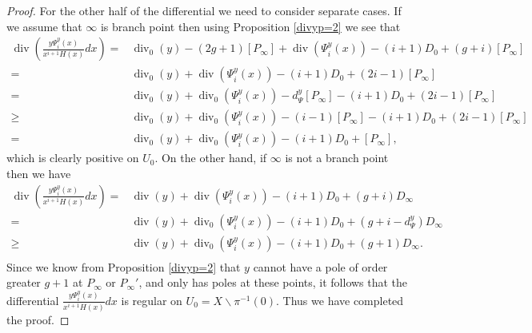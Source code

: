 \documentclass[draft, 11pt]{article} %
\theoremstyle{plain}
\theoremstyle{remark}
\DeclareMathOperator{\di}{div}
\begin{document}
\begin{proof}
For the other half of the differential we need to consider separate cases.
If we assume that $\infty$ is branch point then  using Proposition \ref{divyp=2} we see that
\begin{align*}
\di\left(\frac{y\Psi_i^y(x) }{x^{i+1}H(x)}dx \right)  =  & \di_0(y) - (2g+1)[P_\infty] + \di(\Psi_i^y(x)) - (i+1)D_0 + (g+i)[P_\infty] \\
 =  & \di_0(y) + \di(\Psi_i^y(x)) -(i+1)D_0 + (2i -1)[P_\infty] \\
 = &  \di_0(y) + \di_0(\Psi_i^y(x)) - d_\Psi^y[P_\infty] - (i+1)D_0 + (2i-1)[P_\infty] \\
 \geq &  \di_0(y) + \di_0(\Psi_i^y(x)) -(i-1)[P_\infty] -(i+1)D_0 + (2i-1)[P_\infty] \\
 =   &\di_0(y) + \di_0(\Psi_i^y(x)) -(i+1)D_0 + [P_\infty],
\end{align*}
which is clearly positive on $U_0$.
On the other hand, if $\infty$ is not a branch point then we have
\begin{align*}
\di\left(\frac{y\Psi_i^y(x) }{x^{i+1}H(x)}dx \right)  =  & \di(y) + \di(\Psi_i^y(x)) - (i+1)D_0 + (g+i)D_\infty \\
= & \di(y) + \di_0(\Psi_i^y(x)) - (i+1)D_0 + (g+i - d_\Psi^y)D_\infty \\
\geq & \di(y) + \di_0(\Psi_i^y(x)) - (i+1)D_0 + (g+1)D_\infty. \\
\end{align*}
Since we know from Proposition \ref{divyp=2} that $y$ cannot have a pole of order greater $g+1$ at $P_\infty$ or $P_\infty'$, and only has poles at these points, it follows that the differential $\frac{y\Psi_i^y(x) }{x^{i+1}H(x)}dx$ is regular on $U_0 = X \backslash \pi^{-1}(0)$.
Thus we have completed the proof.


\end{proof}





























\end{document}
